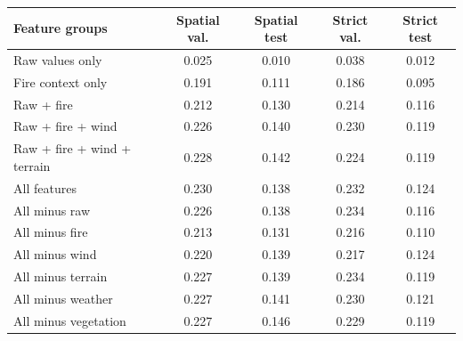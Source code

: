 \begin{tabular}{lcccc}
\toprule
Feature groups & Spatial val. & Spatial test & Strict val. & Strict test \\
\midrule
Raw values only & 0.025 & 0.010 & 0.038 & 0.012 \\
Fire context only & 0.191 & 0.111 & 0.186 & 0.095 \\
Raw + fire & 0.212 & 0.130 & 0.214 & 0.116 \\
Raw + fire + wind & 0.226 & 0.140 & 0.230 & 0.119 \\
Raw + fire + wind + terrain & 0.228 & 0.142 & 0.224 & 0.119 \\
All features & 0.230 & 0.138 & 0.232 & 0.124 \\
All minus raw & 0.226 & 0.138 & 0.234 & 0.116 \\
All minus fire & 0.213 & 0.131 & 0.216 & 0.110 \\
All minus wind & 0.220 & 0.139 & 0.217 & 0.124 \\
All minus terrain & 0.227 & 0.139 & 0.234 & 0.119 \\
All minus weather & 0.227 & 0.141 & 0.230 & 0.121 \\
All minus vegetation & 0.227 & 0.146 & 0.229 & 0.119 \\
\bottomrule
\end{tabular}
